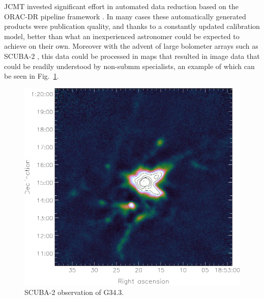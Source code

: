 \documentclass[final,authoryear,5p,times,twocolumn]{elsarticle}
\begin{document}
JCMT invested significant effort in automated data reduction based on
the ORAC-DR pipeline framework
\citep[][]{1999ASPC..172...11E,1999ASPC..172..171J,2005ASPC..347..585G,2008ASPC..394..565J,2015A&C.....9...40J}. In
many cases these automatically generated products were publication
quality, and thanks to a constantly updated calibration model, better
than what an inexperienced astronomer could be expected to achieve on
their own. Moreover with the advent of large bolometer arrays such as
SCUBA-2 \citep{2013MNRAS.430.2513H}, this data could be processed in
maps that resulted in image data that could be readily understood by
non-submm specialists, an example of which can be seen in Fig.~\ref{fig:g34}.

\begin{figure}[t]
\includegraphics[width=\columnwidth]{g34}
\caption{SCUBA-2 observation of G34.3.}
\label{fig:g34}
\end{figure}
\end{document}
